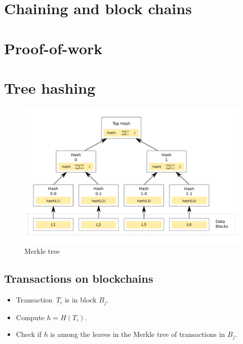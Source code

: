 \section[Chaining]{Chaining and block chains}


\section{Proof-of-work}


\section{Tree hashing}

\begin{frame}
  \begin{figure}
    \includegraphics[width=0.9\columnwidth]{fig/merkle-tree.png}
    \caption{Merkle tree}
  \end{figure}
\end{frame}

\subsection{Transactions on blockchains}

\begin{frame}
  \begin{example}[Transactions]
    \begin{itemize}
      \item Transaction~\(T_i\) is in block \(B_j\).
      \item Compute \(h = H(T_i)\).
      \item Check if \(h\) is among the leaves in the Merkle tree of 
        transactions in \(B_j\).
    \end{itemize}
  \end{example}
\end{frame}

